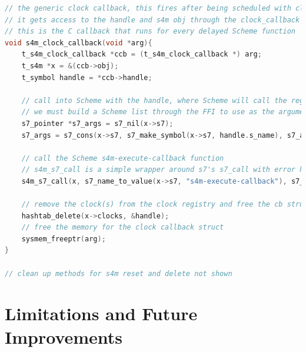 \documentclass[acmsmall, anonymous, review]{acmart}
\begin{document}
\begin{lstlisting}[language=C]
// the generic clock callback, this fires after being scheduled with clock_fdelay 
// it gets access to the handle and s4m obj through the clock_callback struct
// this is the C callback that runs for every delayed Scheme function 
void s4m_clock_callback(void *arg){
    t_s4m_clock_callback *ccb = (t_s4m_clock_callback *) arg;
    t_s4m *x = &(ccb->obj);
    t_symbol handle = *ccb->handle; 
  
    // call into Scheme with the handle, where Scheme will call the registered delayed function
    // we must build a Scheme list through the FFI to use as the arguments
    s7_pointer *s7_args = s7_nil(x->s7);
    s7_args = s7_cons(x->s7, s7_make_symbol(x->s7, handle.s_name), s7_args); 

    // call the Scheme s4m-execute-callback function
    // s4m_s7_call is a simple wrapper around s7's s7_call with error handling and logging 
    s4m_s7_call(x, s7_name_to_value(x->s7, "s4m-execute-callback"), s7_args);   

    // remove the clock(s) from the clock registry and free the cb struct
    hashtab_delete(x->clocks, &handle);
    // free the memory for the clock callback struct 
    sysmem_freeptr(arg);
}

// clean up methods for s4m reset and delete not shown

\end{lstlisting}

\section{Limitations and Future Improvements}
\end{document}

